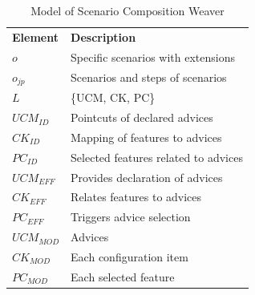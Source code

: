 \documentclass{acm_proc_article-sp}
\begin{document}
\begin{table}[hbt]
\begin{center}
\caption{Model of Scenario Composition Weaver} \label{tab:sc-weaver}
\begin{tabular}{p{0.4in}p{2.6in}}
   \hline\noalign{\smallskip}
  {\bf Element} & {\bf Description} \\
   \noalign{\smallskip}
   \hline
   \noalign{\smallskip}
   $o$               & Specific scenarios with extensions  \\
   $o_{jp}$          & Scenarios and steps of scenarios \\
   $L$               & \{UCM, CK, PC\} \\
   $UCM_{ID}$        & Pointcuts of declared advices \\
   $CK_{ID}$         & Mapping of features to advices \\
   $PC_{ID}$          & Selected features related to advices  \\
   $UCM_{EFF}$       & Provides declaration of advices  \\
   $CK_{EFF}$        & Relates features to advices \\
   $PC_{EFF}$    	 & Triggers advice selection \\
   $UCM_{MOD}$       & Advices \\
   $CK_{MOD}$        & Each configuration item \\
   $PC_{MOD}$        & Each selected feature \\
  \hline
  \end{tabular}
\end{center}
\end{table}

\end{document}
